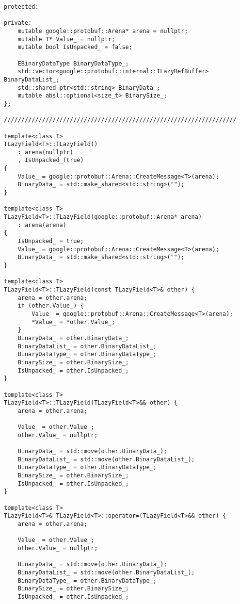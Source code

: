 \begin{lstlisting}[style=CodeListing]
protected:

private:
    mutable google::protobuf::Arena* arena = nullptr;
    mutable T* Value_ = nullptr;
    mutable bool IsUnpacked_ = false;

    EBinaryDataType BinaryDataType_;
    std::vector<google::protobuf::internal::TLazyRefBuffer> BinaryDataList_;
    std::shared_ptr<std::string> BinaryData_;
    mutable absl::optional<size_t> BinarySize_;
};

///////////////////////////////////////////////////////////////////

template<class T>
TLazyField<T>::TLazyField() 
    : arena(nullptr)
    , IsUnpacked_(true)
{
    Value_ = google::protobuf::Arena::CreateMessage<T>(arena);
    BinaryData_ = std::make_shared<std::string>("");
}

template<class T>
TLazyField<T>::TLazyField(google::protobuf::Arena* arena)
    : arena(arena) 
{
    IsUnpacked_ = true;
    Value_ = google::protobuf::Arena::CreateMessage<T>(arena);
    BinaryData_ = std::make_shared<std::string>("");
}

template<class T>
TLazyField<T>::TLazyField(const TLazyField<T>& other) {
    arena = other.arena;
    if (other.Value_) {
        Value_ = google::protobuf::Arena::CreateMessage<T>(arena);
        *Value_ = *other.Value_;
    }
    BinaryData_ = other.BinaryData_;
    BinaryDataList_ = other.BinaryDataList_;
    BinaryDataType_ = other.BinaryDataType_;
    BinarySize_ = other.BinarySize_;
    IsUnpacked_ = other.IsUnpacked_;
}

template<class T>
TLazyField<T>::TLazyField(TLazyField<T>&& other) {
    arena = other.arena;

    Value_ = other.Value_;
    other.Value_ = nullptr;

    BinaryData_ = std::move(other.BinaryData_);
    BinaryDataList_ = std::move(other.BinaryDataList_);
    BinaryDataType_ = other.BinaryDataType_;
    BinarySize_ = other.BinarySize_;
    IsUnpacked_ = other.IsUnpacked_;
}

template<class T>
TLazyField<T>& TLazyField<T>::operator=(TLazyField<T>&& other) {
    arena = other.arena;

    Value_ = other.Value_;
    other.Value_ = nullptr;

    BinaryData_ = std::move(other.BinaryData_);
    BinaryDataList_ = std::move(other.BinaryDataList_);
    BinaryDataType_ = other.BinaryDataType_;
    BinarySize_ = other.BinarySize_;
    IsUnpacked_ = other.IsUnpacked_;


\end{lstlisting}
